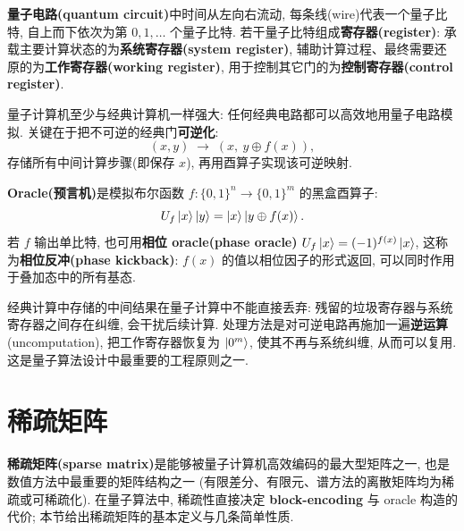 \documentclass[utf8]{article} %
\numberwithin{equation}{section}   %
\newtheorem{Def}{\hskip 2em {\color{green} 定义}}[subsection]
\newtheorem{Prop}{\hskip 2em {\color{cyan} 命题}}[subsection]
\newtheorem{Note}{\hskip 2em {\color{red} 注}}[subsection]
\begin{document}
\begin{Def}[电路约定]
    \textbf{量子电路(quantum circuit)}中时间从左向右流动, 每条线(wire)代表一个量子比特, 自上而下依次为第 $0, 1, \dots$ 个量子比特.
    若干量子比特组成\textbf{寄存器(register)}: 承载主要计算状态的为\textbf{系统寄存器(system register)},
    辅助计算过程、最终需要还原的为\textbf{工作寄存器(working register)},
    用于控制其它门的为\textbf{控制寄存器(control register)}.
\end{Def}

\begin{Prop}[经典计算的量子化]
    量子计算机至少与经典计算机一样强大: 任何经典电路都可以高效地用量子电路模拟.
    关键在于把不可逆的经典门\textbf{可逆化}:
    \begin{equation}
        (x, y) \;\longrightarrow\; (x,\ y \oplus f(x)),
    \end{equation}
    存储所有中间计算步骤(即保存 $x$), 再用酉算子实现该可逆映射.
\end{Prop}

\begin{Def}[Oracle]
    \textbf{Oracle(预言机)}是模拟布尔函数 $f: \{0,1\}^n \to \{0,1\}^m$ 的黑盒酉算子:
    \begin{equation}
        U_f \ket{x}\ket{y} = \ket{x}\ket{y \oplus f(x)}.
    \end{equation}
    若 $f$ 输出单比特, 也可用\textbf{相位 oracle(phase oracle)} $U_f \ket{x} = (-1)^{f(x)}\ket{x}$,
    这称为\textbf{相位反冲(phase kickback)}: $f(x)$ 的值以相位因子的形式返回,
    可以同时作用于叠加态中的所有基态.
\end{Def}

\begin{Note}[Uncomputation]
    经典计算中存储的中间结果在量子计算中不能直接丢弃: 残留的垃圾寄存器与系统寄存器之间存在纠缠,
    会干扰后续计算. 处理方法是对可逆电路再施加一遍\textbf{逆运算}(uncomputation),
    把工作寄存器恢复为 $\ket{0^m}$, 使其不再与系统纠缠, 从而可以复用.
    这是量子算法设计中最重要的工程原则之一.
\end{Note}

\section{稀疏矩阵}

\textbf{稀疏矩阵(sparse matrix)}是能够被量子计算机高效编码的最大型矩阵之一, 也是数值方法中最重要的矩阵结构之一
(有限差分、有限元、谱方法的离散矩阵均为稀疏或可稀疏化). 在量子算法中, 稀疏性直接决定
\textbf{block-encoding} 与 oracle 构造的代价; 本节给出稀疏矩阵的基本定义与几条简单性质.
\end{document}
